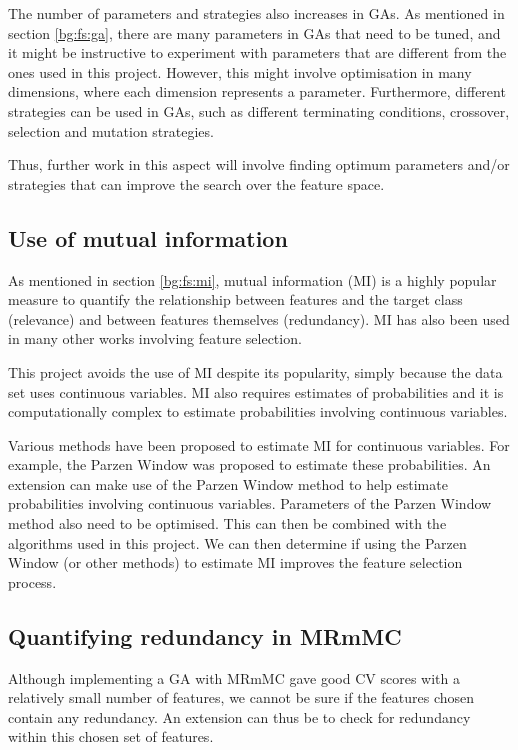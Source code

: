 \documentclass[12pt, twoside, a4paper]{report}
\begin{document}
The number of parameters and strategies also increases in GAs. As mentioned in section \ref{bg:fs:ga}, there are many parameters in GAs that need to be tuned, and it might be instructive to experiment with parameters that are different from the ones used in this project. However, this might involve optimisation in many dimensions, where each dimension represents a parameter. Furthermore, different strategies can be used in GAs, such as different terminating conditions, crossover, selection and mutation strategies.

Thus, further work in this aspect will involve finding optimum parameters and/or strategies that can improve the search over the feature space.


\subsection{Use of mutual information} \label{extension:mi}
As mentioned in section \ref{bg:fs:mi}, mutual information (MI) is a highly popular measure to quantify the relationship between features and the target class (relevance) and between features themselves (redundancy). MI has also been used in many other works involving feature selection.

This project avoids the use of MI despite its popularity, simply because the data set uses continuous variables. MI also requires estimates of probabilities and it is computationally complex to estimate probabilities involving continuous variables.

Various methods have been proposed to estimate MI for continuous variables. For example, the Parzen Window \cite{RefWorks:183} was proposed to estimate these probabilities. An extension can make use of the Parzen Window method to help estimate probabilities involving continuous variables. Parameters of the Parzen Window method also need to be optimised. This can then be combined with the algorithms used in this project. We can then determine if using the Parzen Window (or other methods) to estimate MI improves the feature selection process.


\subsection{Quantifying redundancy in MRmMC}

Although implementing a GA with MRmMC gave good CV scores with a relatively small number of features, we cannot be sure if the features chosen contain any redundancy. An extension can thus be to check for redundancy within this chosen set of features.
\end{document}
